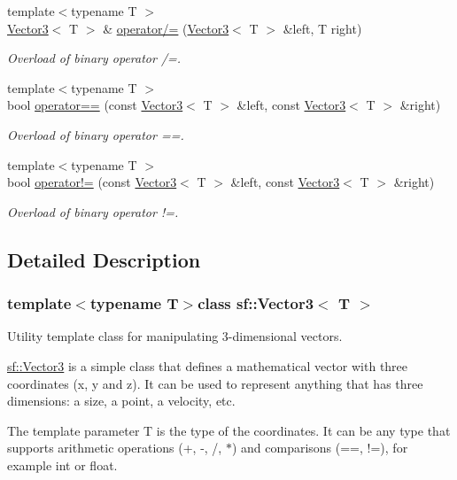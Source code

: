 \begin{DoxyCompactItemize}
{\footnotesize template$<$typename T $>$ }\\\hyperlink{classsf_1_1Vector3}{Vector3}$<$ T $>$ \& \hyperlink{classsf_1_1Vector3_a8995a700f9dffccc6dddb3696ae17b64}{operator/=} (\hyperlink{classsf_1_1Vector3}{Vector3}$<$ T $>$ \&left, T right)
\begin{DoxyCompactList}\small\item\em Overload of binary operator /=. \end{DoxyCompactList}\item 
{\footnotesize template$<$typename T $>$ }\\bool \hyperlink{classsf_1_1Vector3_a388d72db973306a35ba467016b3dee30}{operator==} (const \hyperlink{classsf_1_1Vector3}{Vector3}$<$ T $>$ \&left, const \hyperlink{classsf_1_1Vector3}{Vector3}$<$ T $>$ \&right)
\begin{DoxyCompactList}\small\item\em Overload of binary operator ==. \end{DoxyCompactList}\item 
{\footnotesize template$<$typename T $>$ }\\bool \hyperlink{classsf_1_1Vector3_a608500d1ad3b78082cb5bb4356742bd4}{operator!=} (const \hyperlink{classsf_1_1Vector3}{Vector3}$<$ T $>$ \&left, const \hyperlink{classsf_1_1Vector3}{Vector3}$<$ T $>$ \&right)
\begin{DoxyCompactList}\small\item\em Overload of binary operator !=. \end{DoxyCompactList}\end{DoxyCompactItemize}


\subsection{Detailed Description}
\subsubsection*{template$<$typename T$>$class sf\-::\-Vector3$<$ T $>$}

Utility template class for manipulating 3-\/dimensional vectors. 

\hyperlink{classsf_1_1Vector3}{sf\-::\-Vector3} is a simple class that defines a mathematical vector with three coordinates (x, y and z). It can be used to represent anything that has three dimensions\-: a size, a point, a velocity, etc.

The template parameter T is the type of the coordinates. It can be any type that supports arithmetic operations (+, -\/, /, $\ast$) and comparisons (==, !=), for example int or float.

